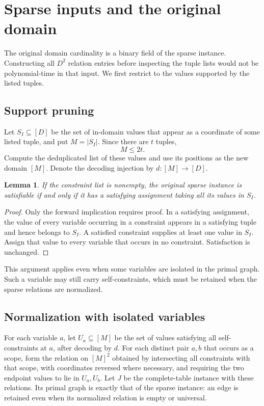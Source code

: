 \documentclass[11pt,reqno]{amsart}
\numberwithin{equation}{section}
\newtheorem{lemma}[theorem]{Lemma}
\theoremstyle{definition}
\theoremstyle{remark}
\begin{document}
\section{Sparse inputs and the original domain}\label{sec:sparse}

The original domain cardinality is a binary field of the sparse instance. Constructing all $D^2$ relation entries before inspecting the tuple lists would not be polynomial-time in that input. We first restrict to the values supported by the listed tuples.

\subsection{Support pruning}

Let $S_I\subseteq[D]$ be the set of in-domain values that appear as a coordinate of some listed tuple, and put $M=|S_I|$. Since there are $t$ tuples,
\begin{equation}\label{eq:support-size}
 M\le2t.
\end{equation}
Compute the deduplicated list of these values and use its positions as the new domain $[M]$. Denote the decoding injection by $d:[M]\to[D]$.

\begin{lemma}\label{lem:support}
If the constraint list is nonempty, the original sparse instance is satisfiable if and only if it has a satisfying assignment taking all its values in $S_I$.
\end{lemma}
\begin{proof}
Only the forward implication requires proof. In a satisfying assignment, the value of every variable occurring in a constraint appears in a satisfying tuple and hence belongs to $S_I$. A satisfied constraint supplies at least one value in $S_I$. Assign that value to every variable that occurs in no constraint. Satisfaction is unchanged.
\end{proof}

This argument applies even when some variables are isolated in the primal graph. Such a variable may still carry self-constraints, which must be retained when the sparse relations are normalized.

\subsection{Normalization with isolated variables}

For each variable $a$, let $U_a\subseteq[M]$ be the set of values satisfying all self-constraints at $a$, after decoding by $d$. For each distinct pair $a,b$ that occurs as a scope, form the relation on $[M]^2$ obtained by intersecting all constraints with that scope, with coordinates reversed where necessary, and requiring the two endpoint values to lie in $U_a,U_b$. Let $J$ be the complete-table instance with these relations. Its primal graph is exactly that of the sparse instance: an edge is retained even when its normalized relation is empty or universal.
\end{document}

